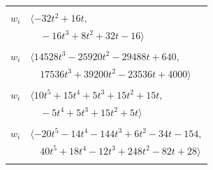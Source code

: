 \documentclass[11pt]{article}
\begin{document}
\begin{longtable}{@{}ll@{}}
\addlinespace[2pt]
\multicolumn{2}{@{}p{0.97\textwidth}@{}}{$i=27$, $D_i=2$, $e_i=5$, $\rho_{ij}$: $0{:}1, \allowbreak 5{:}3, \allowbreak 7{:}3, \allowbreak 34{:}1, \allowbreak 36{:}1, \allowbreak 46{:}1, \allowbreak 47{:}1$}\\
$w_i$ & $\langle -32t^{2}+16t,$\\
 & $\quad -16t^{3}+8t^{2}+32t-16\rangle$\\
\addlinespace[2pt]
\multicolumn{2}{@{}p{0.97\textwidth}@{}}{$i=28$, $D_i=1$, $e_i=1$, $\rho_{ij}$: $3{:}2, \allowbreak 5{:}2, \allowbreak 8{:}3, \allowbreak 11{:}1, \allowbreak 15{:}2, \allowbreak 23{:}3, \allowbreak 34{:}1, \allowbreak 35{:}3, \allowbreak 37{:}1, \allowbreak 44{:}2, \allowbreak 48{:}3, \allowbreak 56{:}3$}\\
$w_i$ & $\langle 14528t^{3}-25920t^{2}-29488t+640,$\\
 & $\quad 17536t^{3}+39200t^{2}-23536t+4000\rangle$\\
\addlinespace[2pt]
\multicolumn{2}{@{}p{0.97\textwidth}@{}}{$i=29$, $D_i=1$, $\rho_{ij}$: $1{:}2, \allowbreak 5{:}2, \allowbreak 6{:}2, \allowbreak 17{:}2, \allowbreak 22{:}1, \allowbreak 25{:}1, \allowbreak 38{:}3, \allowbreak 40{:}3, \allowbreak 44{:}2, \allowbreak 53{:}1, \allowbreak 56{:}1$}\\
$w_i$ & $\langle 10t^{5}+15t^{4}+5t^{3}+15t^{2}+15t,$\\
 & $\quad -5t^{4}+5t^{3}+15t^{2}+5t\rangle$\\
\addlinespace[2pt]
\multicolumn{2}{@{}p{0.97\textwidth}@{}}{$i=30$, $D_i=1$, $\rho_{ij}$: $0{:}1, \allowbreak 3{:}1, \allowbreak 4{:}3, \allowbreak 6{:}1, \allowbreak 14{:}3, \allowbreak 20{:}2, \allowbreak 21{:}1, \allowbreak 22{:}3, \allowbreak 25{:}1, \allowbreak 32{:}2, \allowbreak 36{:}1, \allowbreak 37{:}2, \allowbreak 42{:}2, \allowbreak 46{:}3, \allowbreak 47{:}3, \allowbreak 48{:}1, \allowbreak 51{:}3$}\\
$w_i$ & $\langle -20t^{5}-14t^{4}-144t^{3}+6t^{2}-34t-154,$\\
 & $\quad 40t^{5}+18t^{4}-12t^{3}+248t^{2}-82t+28\rangle$\\
\addlinespace[2pt]
\multicolumn{2}{@{}p{0.97\textwidth}@{}}{$i=31$, $D_i=1$, $\rho_{ij}$: $1{:}2, \allowbreak 3{:}3, \allowbreak 4{:}1, \allowbreak 9{:}2, \allowbreak 10{:}1, \allowbreak 13{:}2, \allowbreak 14{:}3, \allowbreak 16{:}1, \allowbreak 22{:}3, \allowbreak 24{:}1, \allowbreak 33{:}1, \allowbreak 37{:}1, \allowbreak 40{:}2, \allowbreak 43{:}2, \allowbreak 51{:}3, \allowbreak 54{:}2, \allowbreak 56{:}2$}\\

\end{longtable}
\end{document}
